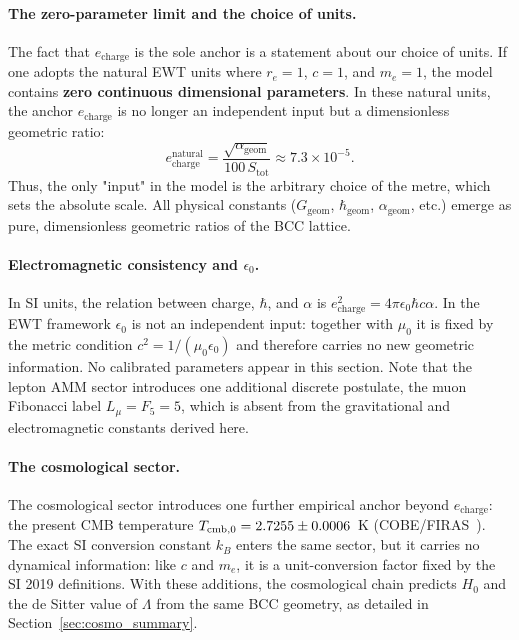 \documentclass[10pt,a4paper]{article}
\begin{document}
\paragraph{The zero-parameter limit and the choice of units.}
The fact that \(e_{\text{charge}}\) is the sole anchor is a statement about our choice of units. If one adopts the natural EWT units where \(r_e = 1\), \(c = 1\), and \(m_e = 1\), the model contains \textbf{zero continuous dimensional parameters}. In these natural units, the anchor \(e_{\text{charge}}\) is no longer an independent input but a dimensionless geometric ratio:
\begin{equation}
	e_{\text{charge}}^{\text{natural}} = \frac{\sqrt{\alpha_{\text{geom}}}}{100 \, S_{\text{tot}}} \approx 7.3 \times 10^{-5}.
\end{equation}
Thus, the only "input" in the model is the arbitrary choice of the metre, which sets the absolute scale. All physical constants (\(G_{\text{geom}}\), \(\hbar_{\text{geom}}\), \(\alpha_{\text{geom}}\), etc.) emerge as pure, dimensionless geometric ratios of the BCC lattice.

\paragraph{Electromagnetic consistency and \(\epsilon_0\).}
In SI units, the relation between charge, \(\hbar\), and \(\alpha\) is \(e_{\text{charge}}^2 = 4\pi\epsilon_0\hbar c\alpha\). In the EWT framework \(\epsilon_0\) is not an independent input: together with \(\mu_0\) it is fixed by the metric condition \(c^2 = 1/(\mu_0\epsilon_0)\) and therefore carries no new geometric information. No calibrated parameters appear in this section. Note that the lepton AMM sector introduces one additional discrete postulate, the muon Fibonacci label \(L_\mu = F_5 = 5\), which is absent from the gravitational and electromagnetic constants derived here.

\paragraph{The cosmological sector.}
The cosmological sector introduces one further empirical anchor beyond \(e_{\text{charge}}\): the present CMB temperature \(T_{\rm cmb,0} = 2.7255 \pm 0.0006\)~K (COBE/FIRAS~\cite{Fixsen2009}). The exact SI conversion constant \(k_B\) enters the same sector, but it carries no dynamical information: like \(c\) and \(m_e\), it is a unit-conversion factor fixed by the SI 2019 definitions. With these additions, the cosmological chain predicts \(H_0\) and the de Sitter value of \(\Lambda\) from the same BCC geometry, as detailed in Section~\ref{sec:cosmo_summary}.
\end{document}
